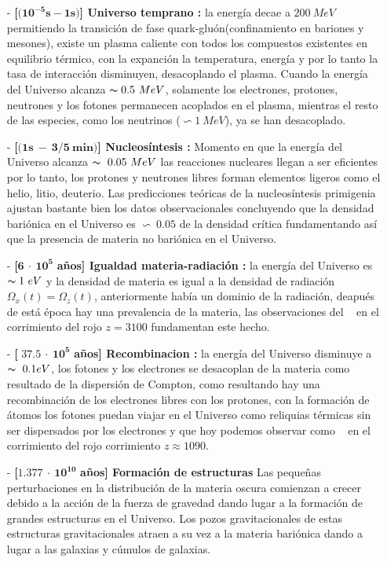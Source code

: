 \begin{itemize}
\item[-] \textbf{[}$(\mathbf{10^{-5}s - 1s )}$\textbf{] Universo temprano :} la energía decae a $200 ~ MeV$ permitiendo la transición de fase quark-gluón(confinamiento en bariones y mesones), existe un plasma caliente con todos los compuestos existentes en equilibrio térmico, con la expanción la temperatura, energía y por lo tanto la tasa de interacción disminuyen, desacoplando el plasma. Cuando la energía del Universo alcanza $\thicksim 0.5 ~ MeV$, solamente los electrones, protones, neutrones y los fotones permanecen acoplados en el plasma, mientras el resto de las especies, como los neutrinos ($\backsim 1 ~ MeV$), ya se han desacoplado.

\item[-] \textbf{[}$(\mathbf{ 1s ~ - ~ 3/5 ~ min )}$\textbf{] Nucleosíntesis :} Momento en que la energía del Universo alcanza $\thicksim ~0.05 ~ MeV$ las reacciones nucleares llegan a ser eficientes por lo tanto, los protones y neutrones libres forman elementos ligeros como el helio, litio, deuterio. Las predicciones teóricas de la nucleosíntesis primigenia ajustan bastante bien los datos observacionales concluyendo que la densidad bariónica en el Universo es $\backsim ~0.05$ de la densidad crítica fundamentando
así que la presencia de materia no bariónica en el Universo.

\item[-] \textbf{[}$\mathbf{6~ \cdot ~ 10^{5}}$ \textbf{a\~nos] Igualdad materia-radiación :} la energía del Universo es $\thicksim 1 ~ eV$ y la densidad de materia es igual a la densidad de radiación $\Omega_x(t) = \Omega_z(t)$, anteriormente había un dominio de la radiación, deapués de está época hay una prevalencia de la materia, las observaciones del \CMB ~ en el corrimiento del rojo $z = 3100$ fundamentan este hecho.

\item[-] \textbf{[} $\mathbf{37.5 ~ \cdot ~ 10^{5}}$ \textbf{a\~nos] Recombinacion :} la energía del Universo disminuye a $\thicksim ~0.1 eV$, los fotones y los electrones se desacoplan de la materia como resultado de la dispersión de Compton, como resultando hay una recombinación de los electrones libres con los protones, con la formación de átomos los fotones puedan viajar en el Universo como reliquias térmicas sin ser dispersados por los electrones y que hoy podemos observar como \CMB ~ en el corrimiento del rojo corrimiento $z \approx 1090$.

\item[-] \textbf{[}$\mathbf{1.377 ~ \cdot ~ 10^{10}}$ \textbf{a\~nos] Formación de estructuras} Las peque\~nas perturbaciones en la distribución de la materia oscura comienzan a crecer debido a la acción de la fuerza de gravedad dando lugar a la formación de grandes estructuras en el Universo. Los pozos gravitacionales de estas estructuras gravitacionales atraen a su vez a la materia bariónica dando a lugar a las galaxias y cúmulos de galaxias.
\end{itemize}

